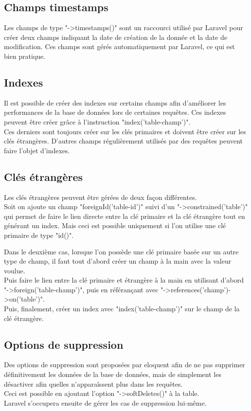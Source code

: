 \documentclass[
    iai, %
    il, %
]{heig-tb}
\begin{document}
\subsection{Champs timestamps}
Les champs de type "->timestamps()" sont un raccourci utilisé par Laravel pour créer deux champs indiquant la date de création de la donnée et la date de modification. Ces champs sont gérés automatiquement par Laravel, ce qui est bien pratique.

\subsection{Indexes}
Il est possible de créer des indexes sur certains champs afin d'améliorer les performances de la base de données lors de certaines requêtes. Ces indexes peuvent être créer grâce à l'instruction "index('table-champ')".\\
Ces derniers sont toujours créer sur les clés primaires et doivent être créer sur les clés étrangères. D'autres champs régulièrement utilisés par des requêtes peuvent faire l'objet d'indexes.

\subsection{Clés étrangères}
Les clés étrangères peuvent être gérées de deux façon différentes.\\
Soit on ajoute un champ "foreignId('table-id')" suivi d'un "->constrained('table')" qui permet de faire le lien directe entre la clé primaire et la clé étrangère tout en générant un index. Mais ceci est possible uniquement si l'on utilise une clé primaire de type "id()".

Dans le deuxième cas, lorsque l'on possède une clé primaire basée sur un autre type de champ, il faut tout d'abord créer un champ à la main avec la valeur voulue.\\
Puis faire le lien entre la clé primaire et étrangère à la main en utilisant d'abord "->foreign('table-champ')", puis en référançant avec "->references('champ')->on('table')".\\
Puis, finalement, créer un index avec "index('table-champ')" sur le champ de la clé étrangère.

\subsection{Options de suppression}
Des options de suppression sont proposées par \Gls{eloquent} afin de ne pas supprimer définitivement les données de la base de données, mais de simplement les désactiver afin quelles n'apparaîssent plus dans les requêtes.\\
Ceci est possible en ajoutant l'option "->softDeletes()" à la table.\\
Laravel s'occupera ensuite de gérer les cas de suppression lui-même.
\end{document}
